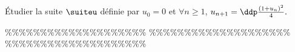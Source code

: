 



\begin{exercice} \;
\'Etudier la suite $\suiteu$ d\'efinie par $u_0=0$ et $\forall n \geq 1$, $u_{n+1}=\ddp\frac{(1+u_n)^2}{4}.$
\end{exercice}


\%\%\%\%\%\%\%\%\%\%\%\%\%\%\%\%\%\%\%\%
\%\%\%\%\%\%\%\%\%\%\%\%\%\%\%\%\%\%\%\%
\%\%\%\%\%\%\%\%\%\%\%\%\%\%\%\%\%\%\%\%




